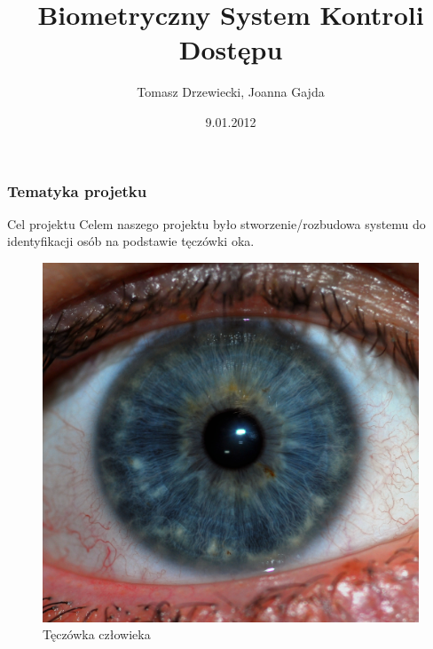 \documentclass{beamer}
\title[Biometryczny System Kontroli Dostępu]{Biometryczny System Kontroli Dostępu}
\author[T. Drzewiecki, J. Gajda]{Tomasz Drzewiecki, Joanna Gajda}
\date[2012]{9.01.2012}
\institute[AGH-EAIE]
{Wydział Elektrotechniki, Automatyki, Informatyki i Elektroniki\\ 
Katedra Automatyki
}
\begin{document}
{
 \begin{frame}
   \titlepage
 \end{frame}
}


\begin{frame}
\frametitle{Tematyka projetku}

\begin{block}{Cel projektu}
Celem naszego projektu było stworzenie/rozbudowa systemu do identyfikacji osób na podstawie tęczówki oka.
\end{block}

\begin{figure}
\begin{center}
\includegraphics[scale=0.04]{teczowka.jpg}
\caption{Tęczówka człowieka}
\label{fig:teczowka}
\end{center}
\end{figure}

\end{frame}
\end{document}
